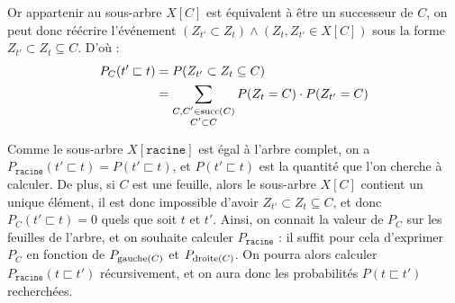 Or appartenir au sous-arbre $X[C]$ est équivalent à être un successeur de $C$, on peut donc réécrire l'événement $(Z_{t'} \subset Z_{t}) \land (Z_t, Z_{t'} \in X[C])$ sous la forme $Z_{t'} \subset Z_{t} \subseteq C$. D'où :
\begin{align}
    P_C(t' \sqsubset t) &= P(Z_{t'} \subset Z_{t} \subseteq C) \nonumber \\
    &= \sum_{\substack{C, C' \in \operatorname{succ}(C) \\  C' \subset C}} P(Z_t = C)\cdot P(Z_{t'} = C) \label{eq:proba_subsumption}
\end{align}



Comme le sous-arbre $X[\texttt{racine}]$ est égal à l'arbre complet, on a $P_\texttt{racine}(t' \sqsubset t) = P(t' \sqsubset t)$, et $P(t' \sqsubset t)$ est la quantité que l'on cherche à calculer. De plus, si $C$ est une feuille, alors le sous-arbre $X[C]$ contient un unique élément, il est donc impossible d'avoir $Z_{t'} \subset Z_{t} \subseteq C$, et donc $P_C(t' \sqsubset t) = 0$ quels que soit $t$ et $t'$. 
Ainsi, on connait la valeur de $P_C$ sur les feuilles de l'arbre, et on souhaite calculer $P_\texttt{racine}$ : il suffit pour cela d'exprimer $P_C$ en fonction de $P_{\operatorname{gauche}(C)}$ et $P_{\operatorname{droite}(C)}$. On pourra alors calculer $P_\texttt{racine}(t \sqsubset t')$ récursivement, et on aura donc les probabilités $P(t \sqsubset t')$ recherchées.

